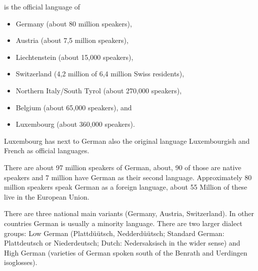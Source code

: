  is the official language of
\begin{itemize}
\item Germany (about 80 million speakers), 
\item Austria (about 7,5 million speakers), 
\item Liechtenstein (about 15,000 speakers), 
\item Switzerland (4,2 million of 6,4 million Swiss residents),
\item Northern Italy/South Tyrol (about 270,000 speakers), 
\item Belgium (about 65,000 speakers), and
\item Luxembourg (about 360,000 speakers).
\end{itemize}
Luxembourg has next to German also the original language Luxembourgish and French as official
languages.

There are about 97 million speakers of German, about, 90 of those are native speakers and 7 million
have German as their second language.
Approximately 80 million speakers speak German as a foreign language, about 55 Million of these live
in the European Union.

There are three national main variants (Germany, Austria, Switzerland). In other countries German is
usually a minority language. There are two larger dialect groups: Low German (Plattdüütsch,
Nedderdüütsch; Standard German: Plattdeutsch or Niederdeutsch; Dutch: Nedersaksisch in the wider
sense) and High German (varieties of German spoken south of the Benrath and Uerdingen isoglosses).





